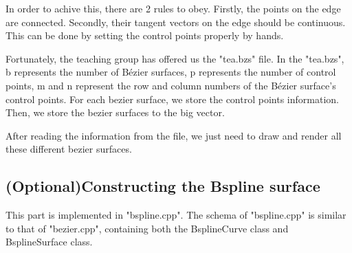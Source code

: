 \documentclass[acmtog]{acmart}
\begin{document}
In order to achive this, there are 2 rules to obey. Firstly, the points on the edge are connected. Secondly, their tangent vectors on the edge should be continuous. 
This can be done by setting the control points properly by hands. 

Fortunately, the teaching group has offered us the "tea.bzs" file. 
In the "tea.bzs", b represents the number of Bézier surfaces, p represents the number of control points, m and n represent the row and column numbers of the Bézier surface's control points. For each bezier surface, we store the control points information. Then, we store the bezier surfaces to the big vector. 

After reading the information from the file, we just need to draw and render all these different bezier surfaces.

\subsection{(Optional)Constructing the Bspline surface}
\quad This part is implemented in "bspline.cpp". The schema of "bspline.cpp" is similar to that of "bezier.cpp", containing both the BsplineCurve class and BsplineSurface class.
\end{document}
